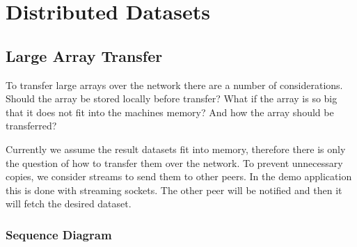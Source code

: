 \chapter{Distributed Datasets}
\label{cha:data}

\section{Large Array Transfer}
To transfer large arrays over the network there are a number of considerations. Should the array be stored locally before transfer? What if the array is so big that it does not fit into the machines memory? And how the array should be transferred?

Currently we assume the result datasets fit into memory, therefore there is only the question of how to transfer them over the network. To prevent unnecessary copies, we consider streams to send them to other peers. In the demo application this is done with streaming sockets. The other peer will be notified and then it will fetch the desired dataset.

\subsection{Sequence Diagram}
